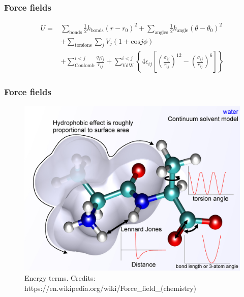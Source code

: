 \documentclass{beamer}
\begin{document}
\begin{frame}\frametitle{Force fields}

\begin{equation}
\begin{aligned}
	U  = & \sum_{\textrm{bonds}} \frac{1}{2} k_{\textrm{bonds}} (r-r_0)^2 + \sum_{\textrm{angles}} \frac{1}{2} k_{\textrm{angle}} 
	(\theta-\theta_0)^2 \\
	&+\sum_{\textrm{torsions}} \sum_j V_j(1+\textrm{cos}j\phi)  \\
 &+ \sum_{\textrm{Coulomb}}^{i<j} \frac{q_i q_j}{r_{ij}}  +  \sum_{\textrm{VdW}}^{i<j} 
\left\{ 4\epsilon_{ij} \left[ \left( \frac{\sigma_{ij}}{r_{ij}} \right)^{12}-  \left( \frac{\sigma_{ij}}{r_{ij}} \right)^{6} \right]  \right\}
\end{aligned}
\end{equation}


\end{frame}

\begin{frame}\frametitle{Force fields}

\begin{figure}
\includegraphics[scale=1.441]{1024px-MM_PEF.png}
\caption{{\scriptsize Energy terms. Credits: https://en.wikipedia.org/wiki/Force\_field\_(chemistry)}}
\end{figure}


\end{frame}
\end{document}

